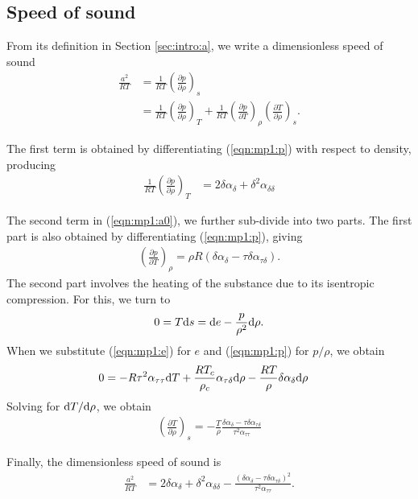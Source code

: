 \subsection{Speed of sound}

From its definition in Section \ref{sec:intro:a}, we write a dimensionless speed of sound
\begin{align}
\frac{a^2}{R T} &= \frac{1}{RT} \left(\frac{\partial p}{\partial \rho}\right)_s\nonumber\\
  &= \frac{1}{RT} \left(\frac{\partial p}{\partial \rho}\right)_T + \frac{1}{RT} \left(\frac{\partial p}{\partial T}\right)_\rho\left(\frac{\partial T}{\partial \rho}\right)_s. \label{eqn:mp1:a0}
\end{align}

The first term is obtained by differentiating (\ref{eqn:mp1:p}) with respect to density, producing
\begin{align}
\frac{1}{RT} \left(\frac{\partial p}{\partial \rho}\right)_T &= 2 \delta \alpha_\delta + \delta^2 \alpha_{\delta\delta}
\end{align}

The second term in (\ref{eqn:mp1:a0}), we further sub-divide into two parts.  The first part is also obtained by differentiating (\ref{eqn:mp1:p}), giving
\begin{align}
\left(\frac{\partial p}{\partial T}\right)_\rho = \rho R (\delta \alpha_\delta - \tau \delta \alpha_{\tau \delta}).
\end{align}
The second part involves the heating of the substance due to its isentropic compression.  For this, we turn to 
\begin{align*}
0 = T \mathrm{d} s = \mathrm{d} e - \frac{p}{\rho^2}\mathrm{d} \rho.
\end{align*}
When we substitute (\ref{eqn:mp1:e}) for $e$ and (\ref{eqn:mp1:p}) for $p/\rho$, we obtain
\begin{align*}
0 &= -R \tau^2 \alpha_{\tau\tau} \mathrm{d} T + \frac{R T_c}{\rho_c} \alpha_{\tau\delta} \mathrm{d} \rho - \frac{RT}{\rho} \delta \alpha_\delta \mathrm{d} \rho
\end{align*}
Solving for $\mathrm{d} T / \mathrm{d} \rho$, we obtain
\begin{align}
\left(\frac{\partial T}{\partial \rho}\right)_s = -\frac{T}{\rho}\frac{\delta\alpha_\delta - \tau\delta\alpha_{\tau\delta}}{\tau^2 \alpha_{\tau\tau}}
\end{align}

Finally, the dimensionless speed of sound is
\begin{align}
\frac{a^2}{RT} &= 2\delta \alpha_\delta + \delta^2 \alpha_{\delta\delta} - \frac{(\delta \alpha_\delta - \tau\delta \alpha_{\tau\delta})^2}{\tau^2\alpha_{\tau\tau}}.\label{eqn:mp1:a}
\end{align}


